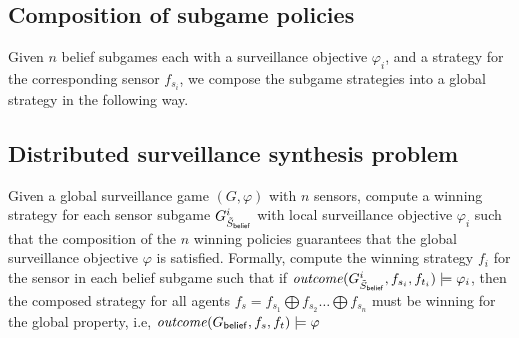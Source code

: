 \subsection{Composition of subgame policies}
Given $n$ belief subgames each with a surveillance objective $\varphi_i$, and a strategy for the corresponding sensor $f_{s_i}$, we compose the subgame strategies into a global strategy in the following way.

 




\subsection{Distributed surveillance synthesis problem}
Given a global surveillance game $(G,\varphi)$ with $n$ sensors, compute a winning strategy for each sensor subgame $G^{i}_{\tilde{S}_{\mathsf{belief}}}$ with local surveillance objective $\varphi_i$ such that the composition of the $n$ winning policies guarantees that the global surveillance objective $\varphi$ is satisfied. Formally, compute the winning strategy $f_i$ for the sensor in each belief subgame such that if $\mathit{outcome}(G^{i}_{\tilde{S}_{\mathsf{belief}}},f_{s_i},f_{t_i}) \models \varphi_i$, then the composed strategy for all agents $f_s = f_{s_1} \bigoplus f_{s_2} \dots \bigoplus f_{s_n}$ must be winning for the global property, i.e, $\mathit{outcome}(G_{\mathsf{belief}},f_{s},f_{t}) \models \varphi$





